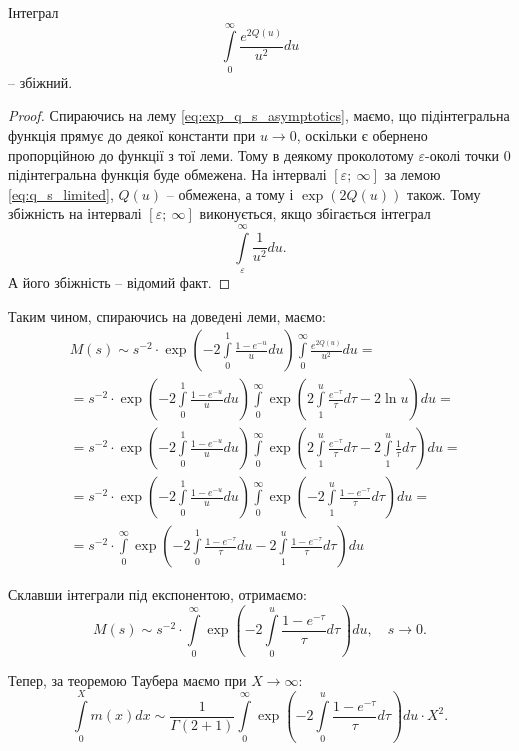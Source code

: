 \begin{lem}
	Інтеграл
	$$
		\int\limits_0^\infty \frac{e^{2Q(u)}}{u^2} du
	$$
	– збіжний.
\end{lem}
\begin{proof}
	Спираючись на лему \eqref{eq:exp_q_s_asymptotics}, маємо, що підінтегральна функція прямує до деякої константи при $u \rightarrow 0$, оскільки є обернено пропорційною до функції з тої леми. Тому в деякому проколотому $\varepsilon$-околі точки 0 підінтегральна функція буде обмежена. На інтервалі $[\varepsilon; ~\infty]$ за лемою \eqref{eq:q_s_limited}, $Q(u)$ – обмежена, а тому і $\exp(2Q(u))$ також. Тому збіжність на інтервалі $[\varepsilon; ~\infty]$ виконується, якщо збігається інтеграл
	\[
		\int\limits_\varepsilon^\infty \frac{1}{u^2} du.
	\]
	А його збіжність – відомий факт.
\end{proof}
		
Таким чином, спираючись на доведені леми, маємо:
\begin{align*}
&M(s) \sim s^{-2} \cdot \exp\left(-2\int\limits_0^1 \frac{1-e^{-u}}{u} du\right) \int\limits_0^\infty \frac{e^{2Q(u)}}{u^2} du = \\
& = s^{-2} \cdot \exp\left(-2\int\limits_0^1 \frac{1-e^{-u}}{u} du\right) \int\limits_0^\infty \exp\left(2\int\limits_1^u \frac{e^{-\tau}}{\tau} d\tau - 2 \ln u\right) du = \\
& = s^{-2} \cdot \exp\left(-2\int\limits_0^1 \frac{1-e^{-u}}{u} du\right) \int\limits_0^\infty \exp\left(2\int\limits_1^u \frac{e^{-\tau}}{\tau} d\tau - 2  \int\limits_1^u  \frac{1}{\tau} d\tau \right) du = \\
& = s^{-2} \cdot \exp\left(-2\int\limits_0^1 \frac{1-e^{-u}}{u} du\right) \int\limits_0^\infty \exp\left(-2\int\limits_1^u \frac{1 - e^{-\tau}}{\tau} d\tau  \right) du = \\
& = s^{-2} \cdot \int\limits_0^\infty \exp\left( -2\int\limits_0^1 \frac{1-e^{-\tau}}{\tau} du -2\int\limits_1^u \frac{1 - e^{-\tau}}{\tau} d\tau  \right) du 
\end{align*}

Склавши інтеграли під експонентою, отримаємо:
\begin{equation}
	M(s) \sim s^{-2} \cdot \int\limits_0^\infty \exp\left( -2\int\limits_0^u \frac{1 - e^{-\tau}}{\tau} d\tau  \right) du, \quad s \rightarrow 0.
\end{equation}

Тепер, за теоремою Таубера маємо при $X \rightarrow \infty$:
\begin{equation}
	\int\limits_0^X m(x) dx \sim \frac{1}{\Gamma(2 + 1)} \int\limits_0^\infty \exp\left( -2\int\limits_0^u \frac{1 - e^{-\tau}}{\tau} d\tau  \right) du \cdot X^2.
\end{equation}

